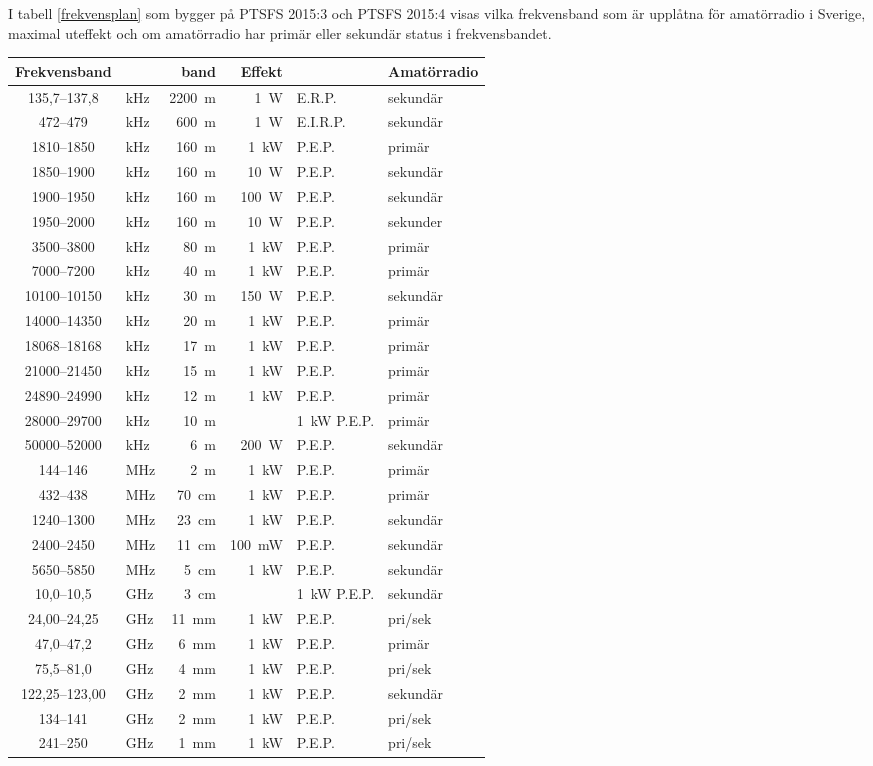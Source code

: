I tabell \ref{frekvensplan} som bygger på PTSFS 2015:3 och PTSFS 2015:4 visas
vilka frekvensband som är upplåtna för amatörradio i Sverige, maximal uteffekt
och om amatörradio har primär eller sekundär status i frekvensbandet.

\begin{table*}[ht] 
\begin{tabular}{clr|rl|l} 
Frekvensband &  & band & Effekt & & Amatörradio\\ \hline 
135,7--137,8 & kHz & 2200~m & 1~W & E.R.P. & sekundär\\ 
472--479 & kHz & 600~m & 1~W & E.I.R.P. & sekundär\\ 
1810--1850 & kHz & 160~m & 1~kW & P.E.P. & primär\\ 
1850--1900 & kHz & 160~m & 10~W & P.E.P. & sekundär\\ 
1900--1950 & kHz & 160~m & 100~W & P.E.P. & sekundär\\ 
1950--2000 & kHz & 160~m & 10~W & P.E.P. & sekunder\\ 
3500--3800 & kHz & 80~m  & 1~kW & P.E.P. & primär\\ 
7000--7200 & kHz & 40~m  & 1~kW & P.E.P. & primär\\ 
10100--10150 & kHz & 30~m & 150~W & P.E.P. & sekundär\\ 
14000--14350 & kHz & 20~m & 1~kW & P.E.P. & primär\\ 
18068--18168 & kHz & 17~m & 1~kW & P.E.P. & primär\\ 
21000--21450 & kHz & 15~m & 1~kW & P.E.P. & primär\\ 
24890--24990 & kHz & 12~m & 1~kW & P.E.P. & primär\\ 
28000--29700 & kHz & 10~m & & 1~kW P.E.P. & primär\\ 
50000--52000 & kHz & 6~m & 200~W & P.E.P. & sekundär\\ \hline 
144--146 & MHz & 2~m & 1~kW & P.E.P. & primär\\ 
432--438 & MHz & 70~cm & 1~kW & P.E.P. & primär\\ 
1240--1300 & MHz & 23~cm & 1~kW & P.E.P. & sekundär\\ 
2400--2450 & MHz & 11~cm & 100~mW & P.E.P. & sekundär\\ 
5650--5850 & MHz & 5~cm & 1~kW & P.E.P. & sekundär\\ 
10,0--10,5 & GHz & 3~cm & & 1~kW P.E.P. & sekundär\\ 
24,00--24,25 & GHz & 11~mm & 1~kW & P.E.P. & pri/sek\\ 
47,0--47,2 & GHz & 6~mm & 1~kW & P.E.P. & primär\\ 
75,5--81,0 & GHz & 4~mm & 1~kW & P.E.P. & pri/sek\\ 
122,25--123,00 & GHz & 2~mm & 1~kW & P.E.P. & sekundär\\ 
134--141 & GHz & 2~mm & 1~kW & P.E.P. & pri/sek\\ 
241--250 & GHz & 1~mm & 1~kW & P.E.P. & pri/sek\\ 
\end{tabular} 
\caption{Frekvensband för amatörradio i Sverige} 
\label{frekvensplan} 
\end{table*} 
